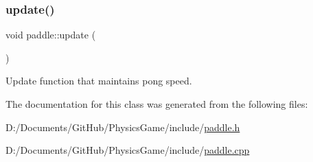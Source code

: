 \subsubsection{\texorpdfstring{update()}{update()}}
{\footnotesize\ttfamily void paddle\+::update (\begin{DoxyParamCaption}{ }\end{DoxyParamCaption})}



Update function that maintains pong speed. 



The documentation for this class was generated from the following files\+:\begin{DoxyCompactItemize}
\item 
D\+:/\+Documents/\+Git\+Hub/\+Physics\+Game/include/\hyperlink{paddle_8h}{paddle.\+h}\item 
D\+:/\+Documents/\+Git\+Hub/\+Physics\+Game/include/\hyperlink{paddle_8cpp}{paddle.\+cpp}\end{DoxyCompactItemize}
